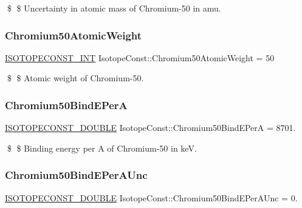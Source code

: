 \$ \$ Uncertainty in atomic mass of Chromium-\/50 in amu. \mbox{\label{group___isotope_const-_chromium-_cr50_gaf303cd8c6e1a4124ef71aade166f3880}} 
\subsubsection{\texorpdfstring{Chromium50\+Atomic\+Weight}{Chromium50AtomicWeight}}
{\footnotesize\ttfamily \mbox{\hyperlink{group___isotope_const-_macros_ga5f18360b3e99483a35c32d789e62621c}{I\+S\+O\+T\+O\+P\+E\+C\+O\+N\+S\+T\+\_\+\+I\+NT}} Isotope\+Const\+::\+Chromium50\+Atomic\+Weight = 50}

\$ \$ Atomic weight of Chromium-\/50. \mbox{\label{group___isotope_const-_chromium-_cr50_ga1d33988218c0304636b9aafa04708b08}} 
\subsubsection{\texorpdfstring{Chromium50\+Bind\+E\+PerA}{Chromium50BindEPerA}}
{\footnotesize\ttfamily \mbox{\hyperlink{group___isotope_const-_macros_ga8f45a7272ce02c0b4c65c44636ed719a}{I\+S\+O\+T\+O\+P\+E\+C\+O\+N\+S\+T\+\_\+\+D\+O\+U\+B\+LE}} Isotope\+Const\+::\+Chromium50\+Bind\+E\+PerA = 8701.}

\$ \$ Binding energy per A of Chromium-\/50 in keV. \mbox{\label{group___isotope_const-_chromium-_cr50_gacc4c53e6df6be5618ca5ee991e97f776}} 
\subsubsection{\texorpdfstring{Chromium50\+Bind\+E\+Per\+A\+Unc}{Chromium50BindEPerAUnc}}
{\footnotesize\ttfamily \mbox{\hyperlink{group___isotope_const-_macros_ga8f45a7272ce02c0b4c65c44636ed719a}{I\+S\+O\+T\+O\+P\+E\+C\+O\+N\+S\+T\+\_\+\+D\+O\+U\+B\+LE}} Isotope\+Const\+::\+Chromium50\+Bind\+E\+Per\+A\+Unc = 0.}

